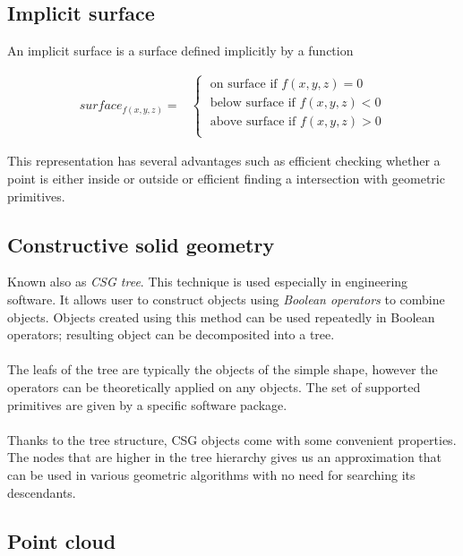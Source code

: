 \subsection{Implicit surface}
An implicit surface is a surface defined implicitly by a function

\begin{equation}
\begin{split}
surface_{f(x,y,z)} =
  &\left\{\;
    \begin{split}
      \text{on surface if }f(x,y,z) = 0 \\ 
      \text{below surface if }f(x,y,z) < 0 \\
      \text{above surface if }f(x,y,z) > 0 \\
    \end{split}
  \right.
\end{split}
\end{equation}

This representation has several advantages such as efficient checking whether a point is either
inside or outside or efficient finding a intersection with geometric primitives.

\subsection{Constructive solid geometry}

Known also as \emph{CSG tree}. This technique is used especially in engineering software. It allows
user to construct objects using \emph{Boolean operators} to combine objects. Objects created using this
method can be used repeatedly in Boolean operators; resulting object can be decomposited into a tree.
\\
\\
The leafs of the tree are typically the objects of the simple shape, however the operators can be
theoretically applied on any objects. The set of supported primitives are given by a specific
software package.
\\
\\
Thanks to the tree structure, CSG objects come with some convenient properties. The nodes that
are higher in the tree hierarchy gives us an approximation that can be used in various geometric
algorithms with no need for searching its descendants.

\subsection{Point cloud}

